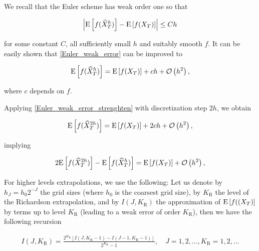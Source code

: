 We  recall that the Euler scheme has weak order one so that

\begin{align}\label{Euler_weak_error}
	\left\lvert\mathrm{E}\left[f(\widehat{X}_T^h)\right]-\mathrm{E}\left[f(X_T)\right] \right\rvert  \leq C h
\end{align}

for some constant $C$, all sufficiently small $h$ and suitably smooth $f$. It can be easily  shown that  \eqref{Euler_weak_error} can be improved to


\begin{align}\label{Euler_weak_error_strenghten}
	\mathrm{E}\left[f(\widehat{X}_T^h)\right]= \mathrm{E}\left[f(X_T)\right] + c h +{\mathcal{O}}\left(h^2\right) ,
\end{align}


where $c$ depends on $f$. 

Applying \eqref{Euler_weak_error_strenghten} with discretization step $2h$, we  obtain

\begin{align}\label{Euler_weak_error_strenghten_2h}
	\mathrm{E}\left[f(\widehat{X}_T^{2h})\right]= \mathrm{E}\left[f(X_T)\right] + 2 c h +{\mathcal{O}}\left(h^2\right) ,
\end{align}

implying

\begin{align}\label{Richardson_extrapol}
	2 \mathrm{E}\left[f(\widehat{X}_T^{2h})\right]- \mathrm{E}\left[f(\widehat{X}_T^{h})\right] =\mathrm{E}\left[f(X_T)\right] + {\mathcal{O}}\left(h^2\right) ,
\end{align}

For higher levels extrapolations, we use the following: Let us denote by $h_J=h_0 2^{-J}$ the grid sizes (where $h_0$ is the coarsest grid size), by $K_\text{R}$ the level of the Richardson extrapolation, and by $I(J,K_\text{R})$ the approximation of $\mathrm{E}\left[f((X_T)\right]$ by terms up to level $K_\text{R}$ (leading to a weak error of order $K_\text{R}$), then we have the following recursion 

\begin{align}
I(J,K_\text{R})=\frac{2^{K_\text{R}}\left[I(J,K_\text{R}-1)-I(J-1,K_\text{R}-1)\right]}{2^{K_\text{R}}-1},\quad J=1,2,\dots, K_\text{R}=1,2,\dots
\end{align}






